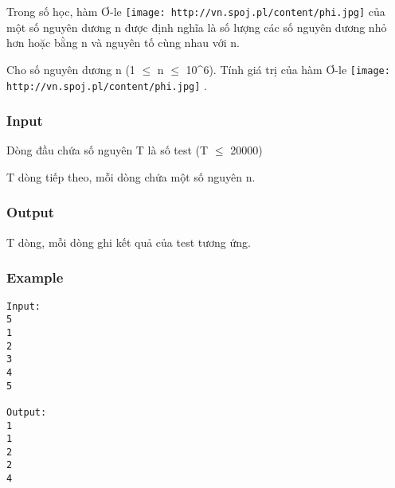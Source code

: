 



   Trong số học, hàm Ơ-le   
\texttt{[image: http://vn.spoj.pl/content/phi.jpg]}   của một số nguyên dương n được định nghĩa là số lượng các số nguyên dương nhỏ hơn hoặc bằng n và nguyên tố cùng nhau với n.  

   Cho số nguyên dương n (1  $\le$  n  $\le$  10\textasciicircum6). Tính giá trị của hàm Ơ-le   
\texttt{[image: http://vn.spoj.pl/content/phi.jpg]}   .  

\subsubsection{   Input  }

   Dòng đầu chứa số nguyên T là số test (T  $\le$  20000)  

   T dòng tiếp theo, mỗi dòng chứa một số nguyên n.  

\subsubsection{   Output  }

   T dòng, mỗi dòng ghi kết quả của test tương ứng.  

\subsubsection{   Example  }
\begin{verbatim}
Input:
5
1
2
3
4
5

Output:
1
1
2
2
4

\end{verbatim}
